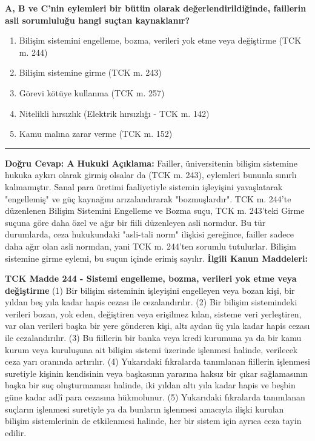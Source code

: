 \documentclass[a4paper, 11pt, twocolumn]{article}
\newenvironment{lawbox}{%
    \par\noindent
    \begin{tcolorbox}[
        colback=lawbg,
        colframe=boxcolor,
        fonttitle=\bfseries,
        boxrule=0.5pt,
        left=3pt,
        right=3pt,
        top=3pt,
        bottom=3pt,
        width=\columnwidth,
        arc=2pt,
        before skip=0.2cm,
        after skip=0.2cm
    ]
    \footnotesize\itshape
}{\end{tcolorbox}}
\begin{document}
\textbf{A, B ve C'nin eylemleri bir bütün olarak değerlendirildiğinde, faillerin asli sorumluluğu hangi suçtan kaynaklanır?}
\begin{enumerate}[label=\Alph*)]
    \item Bilişim sistemini engelleme, bozma, verileri yok etme veya değiştirme (TCK m. 244)
    \item Bilişim sistemine girme (TCK m. 243)
    \item Görevi kötüye kullanma (TCK m. 257)
    \item Nitelikli hırsızlık (Elektrik hırsızlığı - TCK m. 142)
    \item Kamu malına zarar verme (TCK m. 152)
\end{enumerate}
\vspace{0.5cm}
\hrule
\vspace{0.5cm}
\textbf{Doğru Cevap: A}
\newline
\textbf{Hukuki Açıklama:} Failler, üniversitenin bilişim sistemine hukuka aykırı olarak girmiş olsalar da (TCK m. 243), eylemleri bununla sınırlı kalmamıştır. Sanal para üretimi faaliyetiyle sistemin işleyişini yavaşlatarak "engellemiş" ve güç kaynağını arızalandırarak "bozmuşlardır". TCK m. 244'te düzenlenen Bilişim Sistemini Engelleme ve Bozma suçu, TCK m. 243'teki Girme suçuna göre daha özel ve ağır bir fiili düzenleyen asli normdur. Bu tür durumlarda, ceza hukukundaki "asli-tali norm" ilişkisi gereğince, failler sadece daha ağır olan asli normdan, yani TCK m. 244'ten sorumlu tutulurlar. Bilişim sistemine girme eylemi, bu suçun içinde erimiş sayılır.
\vspace{0.5cm}
\textbf{İlgili Kanun Maddeleri:}
\begin{lawbox}
\textbf{TCK Madde 244 - Sistemi engelleme, bozma, verileri yok etme veya değiştirme}
\newline
(1) Bir bilişim sisteminin işleyişini engelleyen veya bozan kişi, bir yıldan beş yıla kadar hapis cezası ile cezalandırılır.
\newline
(2) Bir bilişim sistemindeki verileri bozan, yok eden, değiştiren veya erişilmez kılan, sisteme veri yerleştiren, var olan verileri başka bir yere gönderen kişi, altı aydan üç yıla kadar hapis cezası ile cezalandırılır.
\newline
(3) Bu fiillerin bir banka veya kredi kurumuna ya da bir kamu kurum veya kuruluşuna ait bilişim sistemi üzerinde işlenmesi halinde, verilecek ceza yarı oranında artırılır.
\newline
(4) Yukarıdaki fıkralarda tanımlanan fiillerin işlenmesi suretiyle kişinin kendisinin veya başkasının yararına haksız bir çıkar sağlamasının başka bir suç oluşturmaması halinde, iki yıldan altı yıla kadar hapis ve beşbin güne kadar adlî para cezasına hükmolunur.
\newline
(5) Yukarıdaki fıkralarda tanımlanan suçların işlenmesi suretiyle ya da bunların işlenmesi amacıyla ilişki kurulan bilişim sistemlerinin de etkilenmesi halinde, her bir sistem için ayrıca ceza tayin edilir.
\end{lawbox}
\end{document}
